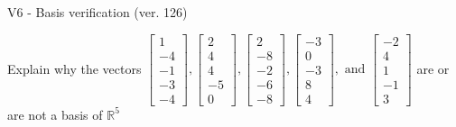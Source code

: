 \begin{exercise}
  \begin{exerciseTitle}V6 - Basis verification (ver. 126)\end{exerciseTitle}
  \begin{exerciseStatement}
    Explain why the vectors \(\left[\begin{array}{r}
1 \\
-4 \\
-1 \\
-3 \\
-4
\end{array}\right] , \left[\begin{array}{r}
2 \\
4 \\
4 \\
-5 \\
0
\end{array}\right] , \left[\begin{array}{r}
2 \\
-8 \\
-2 \\
-6 \\
-8
\end{array}\right] , \left[\begin{array}{r}
-3 \\
0 \\
-3 \\
8 \\
4
\end{array}\right] , \text{ and } \left[\begin{array}{r}
-2 \\
4 \\
1 \\
-1 \\
3
\end{array}\right]\) are or are not a basis of \(\mathbb{R}^5\)	



\end{exerciseStatement}
\end{exercise}
